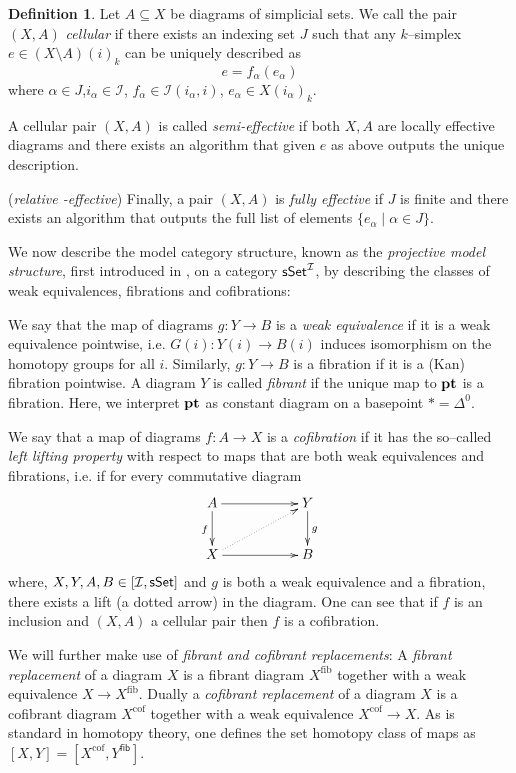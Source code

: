 \documentclass[12pt,a4wide]{article}
\theoremstyle{plain}
\theoremstyle{definition}
\newtheorem{Def}[thm]{Definition}
\newcommand{\cofr}{\mathrm{cof}}
\newcommand{\fibr}{\mathrm{fib}}
\newcommand{\pt}{ \mathrm{\bf pt}}
\newcommand{\heading}[1]{\vspace{1ex}\par\noindent{\bf\boldmath #1}}
\newcommand{\stdsimp}[1]{\Delta^{#1}}
\renewcommand\:{\colon}
\newcommand{\dY}{Y}
\newcommand{\dX}{X}
\newcommand{\icat}{\mathcal I}
\begin{document}
\begin{Def}\label{d:cellulardiagrams}
Let $A\subseteq X$ be diagrams of simplicial sets. 
We call the pair $(X,A)$ \emph{cellular} if there exists an indexing set $J$ such that any $k$--simplex $e \in (X\setminus A) (i)_k$ can be uniquely described as
\[
e = f_\alpha (e _\alpha)
\]
where $\alpha \in J$,$ i_\alpha \in \icat$, $f_\alpha \in \icat(i_\alpha, i)$,  $e _\alpha \in X(i_\alpha)_k$.

A cellular pair $(X,A)$ is called \emph{semi-effective}  if both $X,A$ are locally effective diagrams and there exists an algorithm that given $e$ as above outputs the unique description. 

(\emph{relative -effective})
Finally, a pair $(X,A)$ is \emph{fully effective} if $J$ is finite and there exists an algorithm that outputs the full list of elements $\{e_\alpha \mid \alpha \in J\}$.
\end{Def}

\heading{Model structure}
We now describe the model category structure, known as the \emph{projective model structure}, first introduced in \cite{bous}, on a category $\sSet^\icat$, by describing the classes of weak equivalences, fibrations and cofibrations:

We say that the map of diagrams $g \: Y \to B$ is a \emph{weak equivalence} if it is a weak equivalence pointwise, i.e. $G(i)\:  Y(i) \to B(i) $ induces isomorphism on the homotopy groups for all $i$. Similarly, $g \: Y \to B$ is a fibration if it is a (Kan) fibration pointwise.  A diagram $\dY$ is called \emph{fibrant} if the unique map to $\pt $ is a fibration. Here, we interpret $\pt$ as constant diagram on a basepoint $* = \stdsimp{0}$.

We say that a map of diagrams $f\:A \to X$ is a \emph{cofibration} if it has the so--called \emph{left lifting property} with respect to maps that are both weak equivalences and fibrations, i.e. if for every commutative diagram
\[
\xymatrix{
A \ar[rr] \ar[d]_f && Y \ar[d]^g\\
X \ar[rr] \ar@{.>}[urr] && B 
}
\]
where, $X,Y,A,B \in [\icat, \sSet]$ and $g$ is both a weak equivalence and a fibration, there exists a lift (a dotted arrow) in the diagram. One can see that if $f$ is an inclusion and $(X,A)$ a cellular pair then $f$ is a cofibration.

We will further make use of \emph{fibrant and cofibrant replacements}: A \emph{fibrant replacement} of a diagram $X$ is a fibrant diagram $\dX^\fibr$ together with a weak equivalence $X \to \dX^\fibr$. Dually a \emph{cofibrant replacement} of a diagram $X$ is a cofibrant diagram $\dX^\cofr$ together with a weak equivalence $X^\cofr \to \dX$. As is standard in homotopy theory, one defines the set homotopy class of maps as $[\dX,\dY] = [\dX^\cofr, \dY^\mathsf{fib}]$.
\end{document}
